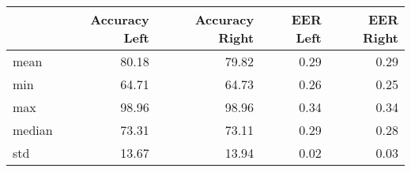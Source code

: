 \begin{tabular}{lrrrr}
\toprule
{} &  Accuracy Left &  Accuracy Right &  EER Left &  EER Right \\
\midrule
mean   &          80.18 &           79.82 &      0.29 &       0.29 \\
min    &          64.71 &           64.73 &      0.26 &       0.25 \\
max    &          98.96 &           98.96 &      0.34 &       0.34 \\
median &          73.31 &           73.11 &      0.29 &       0.28 \\
std    &          13.67 &           13.94 &      0.02 &       0.03 \\
\bottomrule
\end{tabular}
